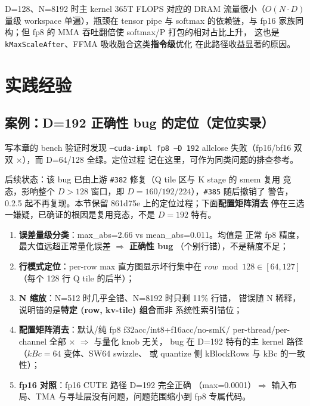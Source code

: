 D=128、N=8192 时主 kernel 365T FLOPS 对应的 DRAM 流量很小（$O(N\cdot D)$
量级 workspace 单遍），瓶颈在 tensor pipe 与 softmax 的依赖链，与
fp16 家族同构；但 fp8 的 MMA 吞吐翻倍使 softmax/P 打包的相对占比上升，
这也是 \texttt{kMaxScaleAfter}、FFMA 吸收融合这类\textbf{指令级}优化
在此路径收益显著的原因。

\section{实践经验}

\subsection{案例：D=192 正确性 bug 的定位（定位实录）}\label{sec:29-d192}

写本章的 bench 验证时发现 \texttt{--cuda-impl fp8 --D 192}
allclose 失败（fp16/bf16 双双 $\times$），而 D=64/128 全绿。定位过程
记在这里，可作为同类问题的排查参考。

后续状态：该 bug 已由上游 \texttt{\#382} 修复（Q tile 区与 K stage 的 smem 复用
竞态，影响整个 $D>128$ 窗口，即 $D{=}160/192/224$），\texttt{\#385} 随后撤销了
警告，0.2.5 起不再复现。本节保留 861d75e 上的定位过程；下面\textbf{配置矩阵消去}
停在三选一嫌疑，已确证的根因是复用竞态，不是 $D{=}192$ 特有。
\begin{enumerate}[itemsep=1pt,topsep=2pt]
  \item \textbf{误差量级分类}：max\_abs=2.66 vs mean\_abs=0.011。均值是
        正常 fp8 精度，最大值远超正常量化误差 $\Rightarrow$ \textbf{正确性 bug}
        （个别行错），不是精度不足；
  \item \textbf{行模式定位}：per-row max 直方图显示坏行集中在
        $row\bmod128\in[64,127]$（每个 128 行 Q tile 的后半）；
  \item \textbf{N 缩放}：N=512 时几乎全错、N=8192 时只剩 11\% 行错，
        错误随 N 稀释，说明错的是\textbf{特定 (row, kv-tile) 组合}而非
        系统性索引错位；
  \item \textbf{配置矩阵消去}：默认/纯 fp8 f32acc/int8+f16acc/no-smK/
        per-thread/per-channel 全部 $\times$ $\Rightarrow$ 与量化 knob 无关，
        bug 在 D=192 特有的主 kernel 路径（$kBc{=}64$ 变体、SW64 swizzle、
        或 quantize 侧 kBlockRows 与 kBc 的一致性）；
  \item \textbf{fp16 对照}：fp16 CUTE 路径 D=192 完全正确
        （max=0.0001）$\Rightarrow$ 输入布局、TMA 与寻址层没有问题，问题范围缩小到
        fp8 专属代码。
\end{enumerate}

